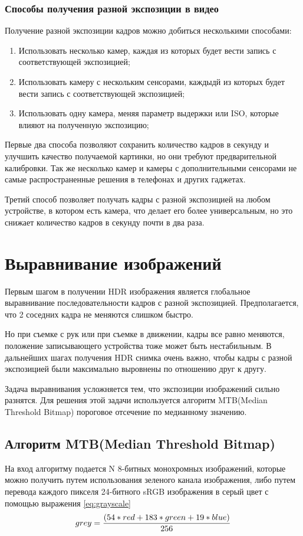 \subsubsection{ Способы получения разной экспозиции в видео}
    Получение разной экспозиции кадров можно добиться несколькими способами\cite{bib1}:
\begin{enumerate}
    \item Использовать несколько камер, каждая из которых будет вести запись с соответствующей экспозицией;
    \item Использовать камеру с нескольким сенсорами, каждыдй из которых будет вести запись с соответствующей экспозицией;
    \item Использовать одну камера, меняя параметр выдержки или ISO, которые влияют на полученную экспозицию;
\end{enumerate}

    Первые два способа позволяют сохранить количество кадров в секунду и улучшить качество получаемой картинки, но они требуют предварительной калибровки. Так же несколько камер и камеры с дополнительными сенсорами не самые распространенные решения в телефонах и других гаджетах.
    
    Третий способ позволяет получать кадры с разной экспозицией на любом устройстве, в котором есть камера, что делает его более универсальным, но это снижает количество кадров в секунду почти в два раза.

\section{ Выравнивание изображений}
    Первым шагом в получении HDR изображения является глобальное выравнивание последовательности кадров с разной экспозицией. Предполагается, что 2 соседних кадра не меняются слишком быстро.

    Но при съемке с рук или при съемке в движении, кадры все равно меняются, положение записывающего устройства тоже может быть нестабильным. В дальнейших шагах получения HDR снимка очень важно, чтобы кадры с разной экспозицией были максимально выровнены по отношению друг к другу. 

    Задача выравнивания усложняется тем, что экспозиции изображений сильно разнятся. Для решения этой задачи используется алгоритм MTB(Median Threshold Bitmap)\cite{bib4} пороговое отсечение по медианному значению.

\subsection{ Алгоритм MTB(Median Threshold Bitmap)}
    На вход алгоритму подается N 8-битных монохромных изображений, которые можно получить путем использования зеленого канала изображения, либо путем перевода каждого пикселя 24-битного sRGB изображения в серый цвет с помощью выражения \ref{eq:grayscale}
\begin{equation}
    \centering{
        grey = \frac{(54*red + 183*green + 19*blue)}{256}}
    \label{eq:grayscale}
\end{equation}

